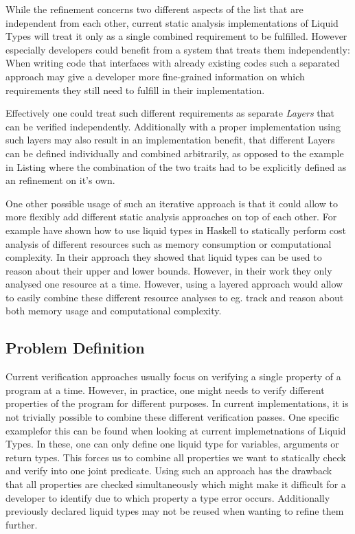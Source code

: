 While the refinement concerns two different aspects of the list that are independent from each other, current static analysis implementations of Liquid Types will treat it only as a single combined requirement to be fulfilled. However especially developers could benefit from a system that treats them independently: When writing code that interfaces with already existing codes such a separated approach may give a developer more fine-grained information on which requirements they still need to fulfill in their implementation.

Effectively one could treat such different requirements as separate \textit{Layers} that can be verified independently. Additionally with a proper implementation using such layers may also result in an implementation benefit, that different Layers can be defined individually and combined arbitrarily, as opposed to the example in Listing  where the combination of the two traits had to be explicitly defined as an refinement on it's own.

One other possible usage of such an iterative approach is that it could allow to more flexibly add different static analysis approaches on top of each other. For example \cite{liquidate-assets} have shown how to use liquid types in Haskell to statically perform cost analysis of different resources such as memory consumption or computational complexity. In their approach they showed that liquid types can be used to reason about their upper and lower bounds. However, in their work they only analysed one resource at a time. However, using a layered approach would allow to easily combine these different resource analyses to eg. track and reason about both memory usage and computational complexity.

\subsection{Problem Definition}
\label{ssec:problem_definition}

Current verification approaches usually focus on verifying a single property of a program at a time. However, in practice, one might needs to verify different properties of the program for different purposes. In current implementations, it is not trivially possible to combine these different verification passes. One specific examplefor this can be found when looking at current implemetnations of Liquid Types. In these, one can only define one liquid type for variables, arguments or return types. This forces us to combine all properties we want to statically check and verify into one joint predicate. Using such an approach has the drawback that all properties are checked simultaneously which might make it difficult for a developer to identify due to which property a type error occurs. Additionally previously declared liquid types may not be reused when wanting to refine them further.

